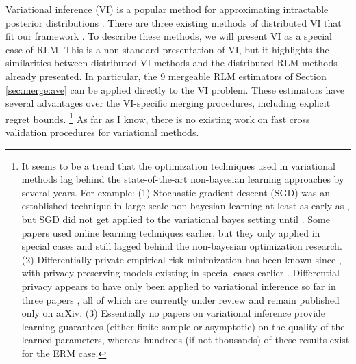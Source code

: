 \documentclass[thesis.tex]{subfiles}
\begin{document}
Variational inference (VI) is a popular method for approximating intractable posterior distributions \citep{jordan1999introduction,blei2017variational}. 
There are three existing methods of distributed VI that fit our framework \citep{broderick2013streaming,campbell2014approximate,neiswanger2015embarrassingly}.
To describe these methods,
we will present VI as a special case of RLM.
This is a non-standard presentation of VI,
but it highlights the similarities between distributed VI methods and the distributed RLM methods already presented.
In particular, the 9 mergeable RLM estimators of Section \ref{sec:merge:ave} can be applied directly to the VI problem.
These estimators have several advantages over the VI-specific merging procedures,
including explicit regret bounds.%
\footnote{
    It seems to be a trend that the optimization techniques used in variational methods lag behind the state-of-the-art non-bayesian learning approaches by several years.
    For example:
    (1) Stochastic gradient descent (SGD) was an established technique in large scale non-bayesian learning at least as early as \citet{bottou2004large},
    but SGD did not get applied to the variational bayes setting until \citet{hoffman2013stochastic}.
    Some papers \citep[e.g.][]{canini2009online,hoffman2010online,wang2011online} used online learning techniques earlier,
    but they only applied in special cases and still lagged behind the non-bayesian optimization research.
    (2) Differentially private empirical risk minimization has been known since \citet{chaudhuri2011differentially}, with privacy preserving models existing in special cases earlier \citep{chaudhuri2009privacy}.
    Differential privacy appears to have only been applied to variational inference so far in three papers \citep{karwa2015private,park2016variational,jalko2016differentially},
    all of which are currently under review and remain published only on arXiv.
    (3) Essentially no papers on variational inference provide learning guarantees (either finite sample or asymptotic) on the quality of the learned parameters,
    whereas hundreds (if not thousands) of these results exist for the ERM case.
}
As far as I know, there is no existing work on fast cross validation procedures for variational methods.
\end{document}
